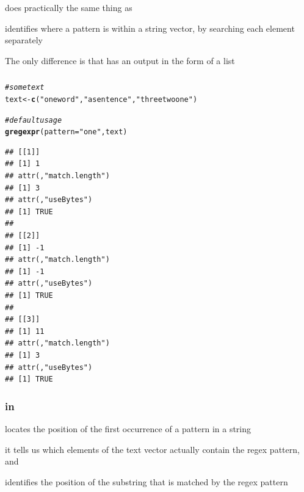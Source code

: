 \documentclass[12pt]{beamer}\usepackage[]{graphicx}\usepackage[]{color}
\makeatletter
\newcommand{\hlstr}[1]{\textcolor[rgb]{0.192,0.494,0.8}{#1}}%
\newcommand{\hlcom}[1]{\textcolor[rgb]{0.678,0.584,0.686}{\textit{#1}}}%
\newcommand{\hlstd}[1]{\textcolor[rgb]{0.345,0.345,0.345}{#1}}%
\newcommand{\hlkwb}[1]{\textcolor[rgb]{0.69,0.353,0.396}{#1}}%
\newcommand{\hlkwc}[1]{\textcolor[rgb]{0.333,0.667,0.333}{#1}}%
\newcommand{\hlkwd}[1]{\textcolor[rgb]{0.737,0.353,0.396}{\textbf{#1}}}%
\newenvironment{kframe}{%
 \def\at@end@of@kframe{}%
 \ifinner\ifhmode%
  \def\at@end@of@kframe{\end{minipage}}%
  \begin{minipage}{\columnwidth}%
 \fi\fi%
 \def\FrameCommand##1{\hskip\@totalleftmargin \hskip-\fboxsep
 \colorbox{shadecolor}{##1}\hskip-\fboxsep
     \hskip-\linewidth \hskip-\@totalleftmargin \hskip\columnwidth}%
 \MakeFramed {\advance\hsize-\width
   \@totalleftmargin\z@ \linewidth\hsize
   \@setminipage}}%
 {\par\unskip\endMakeFramed%
 \at@end@of@kframe}
\newenvironment{knitrout}{}{} %
\makeatother
\begin{document}

\begin{frame}[fragile]
\frametitle{}

\bi
  \item {} does practically the same thing as 
  \item identifies where a pattern is within a string vector, by searching each element separately
  \item The only difference is that  has an output in the form of a list
\ei

\end{frame}


\begin{frame}[fragile]
\frametitle{}

\begin{knitrout}\tiny
{}\color{fgcolor}\begin{kframe}
\begin{alltt}
\hlcom{# some text}
\hlstd{text} \hlkwb{<-} \hlkwd{c}\hlstd{(}\hlstr{"one word"}\hlstd{,} \hlstr{"a sentence"}\hlstd{,} \hlstr{"three two one"}\hlstd{)}

\hlcom{# default usage}
\hlkwd{gregexpr}\hlstd{(}\hlkwc{pattern} \hlstd{=} \hlstr{"one"}\hlstd{, text)}
\end{alltt}
\begin{verbatim}
## [[1]]
## [1] 1
## attr(,"match.length")
## [1] 3
## attr(,"useBytes")
## [1] TRUE
## 
## [[2]]
## [1] -1
## attr(,"match.length")
## [1] -1
## attr(,"useBytes")
## [1] TRUE
## 
## [[3]]
## [1] 11
## attr(,"match.length")
## [1] 3
## attr(,"useBytes")
## [1] TRUE
\end{verbatim}
\end{kframe}
\end{knitrout}

\end{frame}


\begin{frame}[fragile]
\frametitle{ in }

\bi
  \item {} locates the position of the first occurrence of a pattern in a string
  \item it tells us which elements of the text vector actually contain the regex pattern, and
 \item identifies the position of the substring that is matched by the regex pattern
\ei

\end{frame}
\end{document}
